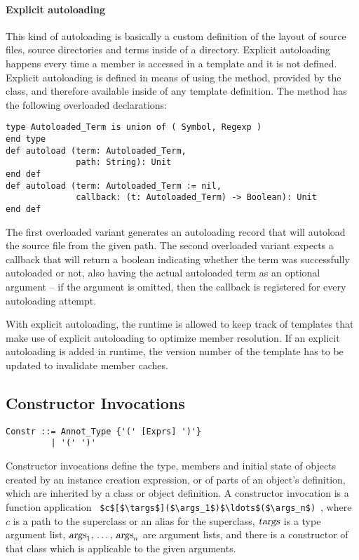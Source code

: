 \paragraph{Explicit autoloading}
This kind of autoloading is basically a custom definition of the layout of source files, source directories and terms inside of a directory. Explicit autoloading happens every time a member is accessed in a template and it is not defined. Explicit autoloading is defined in means of using the  method, provided by the  class, and therefore available inside of any template definition. The method has the following overloaded declarations: 
\begin{lstlisting}
type Autoloaded_Term is union of ( Symbol, Regexp )
end type
def autoload (term: Autoloaded_Term, 
              path: String): Unit
end def
def autoload (term: Autoloaded_Term := nil, 
              callback: (t: Autoloaded_Term) -> Boolean): Unit
end def
\end{lstlisting}
The first overloaded variant generates an autoloading record that will autoload the source file from the given path. The second overloaded variant expects a callback that will return a boolean indicating whether the term was successfully autoloaded or not, also having the actual autoloaded term as an optional argument -- if the argument is omitted, then the callback is registered for every autoloading attempt.

With explicit autoloading, the runtime is allowed to keep track of templates that make use of explicit autoloading to optimize member resolution. If an explicit autoloading is added in runtime, the version number of the template has to be updated to invalidate member caches. 







\subsection{Constructor Invocations}
\label{sec:constructor-invocations}

\syntax\begin{lstlisting}
Constr ::= Annot_Type {'(' [Exprs] ')'}
         | '(' ')'
\end{lstlisting}

Constructor invocations define the type, members and initial state of objects created by an instance creation expression, or of parts of an object's definition, which are inherited by a class or object definition. A constructor invocation is a function application ~\lstinline!$c$[$\targs$]($\args_1$)$\ldots$($\args_n$)!~, where $c$ is a path to the superclass or an alias for the superclass, $\mbox{\sl targs}$ is a type argument list, $\mbox{\sl args}_1 ,\, \ldots ,\, \mbox{\sl args}_n$ are argument lists, and there is a constructor of that class which is applicable to the given arguments. 

